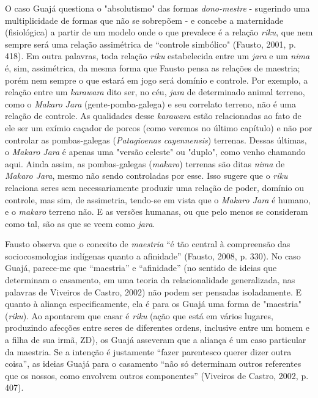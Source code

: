 O caso Guajá questiona o "absolutismo" das formas \emph{dono-mestre} -
sugerindo uma multiplicidade de formas que não se sobrepõem - e concebe
a maternidade (fisiológica) a partir de um modelo onde o que prevalece é
a relação \emph{riku}, que nem sempre será uma relação assimétrica de
``controle simbólico" (Fausto, 2001, p. 418). Em outra palavras, toda
relação \emph{riku} estabelecida entre um \emph{jara} e um \emph{nima}
é, sim, assimétrica, da mesma forma que Fausto pensa as relações de
maestria; porém nem sempre o que estará em jogo será domínio e controle.
Por exemplo, a relação entre um \emph{karawara} dito ser, no céu,
\emph{jara} de determinado animal terreno, como o \emph{Makaro}
\emph{Jara} (gente-pomba-galega) e seu correlato terreno, não é uma
relação de controle. As qualidades desse \emph{karawara} estão
relacionadas ao fato de ele ser um exímio caçador de porcos (como
veremos no último capítulo) e não por controlar as pombas-galegas
(\emph{Patagioenas cayennensis}) terrenas. Dessas últimas, o
\emph{Makaro Jara} é apenas uma "versão celeste" ou "duplo", como venho
chamando aqui. Ainda assim, as pombas-galegas (\emph{makaro}) terrenas
são ditas \emph{nima} de \emph{Makaro Jara}, mesmo não sendo controladas
por esse. Isso sugere que o \emph{riku} relaciona seres sem
necessariamente produzir uma relação de poder, domínio ou controle, mas
sim, de assimetria, tendo-se em vista que o \emph{Makaro Jara} é humano,
e o \emph{makaro} terreno não. E as versões humanas, ou que pelo menos
se consideram como tal, são as que se veem como \emph{jara}.

Fausto observa que o conceito de \emph{maestria} ``é tão central à
compreensão das sociocosmologias indígenas quanto a afinidade'' (Fausto,
2008, p. 330). No caso Guajá, parece-me que ``maestria'' e ``afinidade''
(no sentido de ideias que determinam o casamento, em uma teoria da
relacionalidade generalizada, nas palavras de Viveiros de Castro, 2002)
não podem ser pensadas isoladamente. E quanto à aliança especificamente,
ela é para os Guajá uma forma de "maestria" (\emph{riku}). Ao apontarem
que casar é \emph{riku} (ação que está em vários lugares, produzindo
afecções entre seres de diferentes ordens, inclusive entre um homem e a
filha de sua irmã, ZD), os Guajá asseveram que a aliança é um caso
particular da maestria. Se a intenção é justamente ``fazer parentesco
querer dizer outra coisa'', as ideias Guajá para o casamento ``não só
determinam outros referentes que os nossos, como envolvem outros
componentes'' (Viveiros de Castro, 2002, p. 407).

